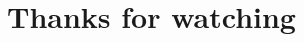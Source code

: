 \documentclass[
 size=12pt,
 paper=smartboard, %
 mode=present, %
 display=slides, %
style=tuliplab,
pauseslide,
fleqn,leqno]{powerdot}
\begin{document}
\section{Thanks for watching}


\end{document}
